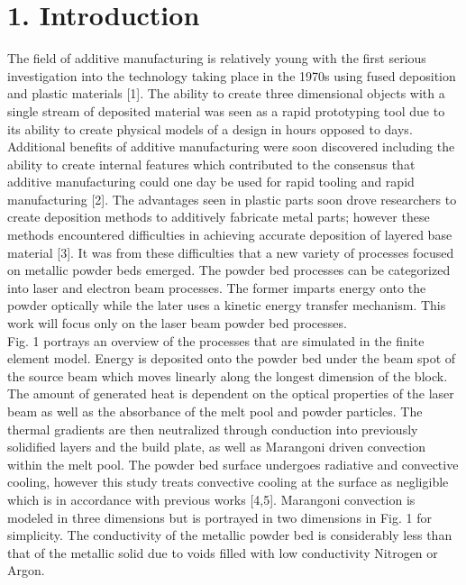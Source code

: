 \documentclass[10pt]{article}
\begin{document}
\section*{1. Introduction}
The field of additive manufacturing is relatively young with the first serious investigation into the technology taking place in the 1970s using fused deposition and plastic materials [1]. The ability to create three dimensional objects with a single stream of deposited material was seen as a rapid prototyping tool due to its ability to create physical models of a design in hours opposed to days. Additional benefits of additive manufacturing were soon discovered including the ability to create internal features which contributed to the consensus that additive manufacturing could one day be used for rapid tooling and rapid manufacturing [2]. The advantages seen in plastic parts soon drove researchers to create deposition methods to additively fabricate metal parts; however these methods encountered difficulties in achieving accurate deposition of layered base material [3]. It was from these difficulties that a new variety of processes focused on metallic powder beds emerged. The powder bed processes can be categorized into laser and electron beam processes. The former imparts energy onto the powder optically while the later uses a kinetic energy transfer mechanism. This work will focus only on the laser beam powder bed processes.\\
Fig. 1 portrays an overview of the processes that are simulated in the finite element model. Energy is deposited onto the powder bed under the beam spot of the source beam which moves linearly along the longest dimension of the block. The amount of generated heat is dependent on the optical properties of the laser beam as well as the absorbance of the melt pool and powder particles. The thermal gradients are then neutralized through conduction into previously solidified layers and the build plate, as well as Marangoni driven convection within the melt pool. The powder bed surface undergoes radiative and convective cooling, however this study treats convective cooling at the surface as negligible which is in accordance with previous works [4,5]. Marangoni convection is modeled in three dimensions but is portrayed in two dimensions in Fig. 1 for simplicity. The conductivity of the metallic powder bed is considerably less than that of the metallic solid due to voids filled with low conductivity Nitrogen or Argon.
\end{document}
